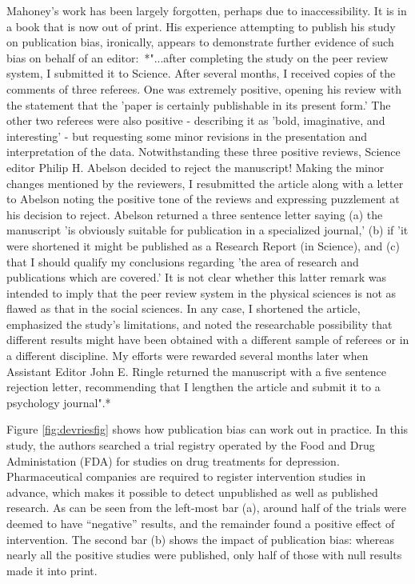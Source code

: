 \documentclass{krantz}
\begin{document}
\begin{tcolorbox}[colback=Black!5!lightgray,colframe=black!75!black,coltitle=white,title=Michael Mahoney: A man ahead of his time]\label{box:Mahoney}
Mahoney's work has been largely forgotten, perhaps due to inaccessibility. It is in a book that is now out of print. His experience attempting to publish his study on publication bias, ironically, appears to demonstrate further evidence of such bias on behalf of an editor:\
*"...after completing the study on the peer review system, I submitted it to Science. After several months, I received copies of the comments of three referees. One was extremely positive, opening his review with the statement that the 'paper is certainly publishable in its present form.' The other two referees were also positive - describing it as 'bold, imaginative, and interesting' - but requesting some minor revisions in the presentation and interpretation of the data. Notwithstanding these three positive reviews, Science editor Philip H. Abelson decided to reject the manuscript! Making the minor changes mentioned by the reviewers, I resubmitted the article along with a letter to Abelson noting the positive tone of the reviews and expressing puzzlement at his decision to reject. Abelson returned a three sentence letter saying (a) the manuscript 'is obviously suitable for publication in a specialized journal,' (b) if 'it were shortened it might be published as a Research Report (in Science), and (c) that I should qualify my conclusions regarding 'the area of research and publications which are covered.' It is not clear whether this latter remark was intended to imply that the peer review system in the physical sciences is not as flawed as that in the social sciences. In any case, I shortened the article, emphasized the study's limitations, and noted the researchable possibility that different results might have been obtained with a different sample of referees or in a different discipline. My efforts were rewarded several months later when Assistant Editor John E. Ringle returned the manuscript with a five sentence rejection letter, recommending that I lengthen the article and submit it to a psychology journal".*

\end{tcolorbox}



Figure \ref{fig:devriesfig} shows how publication bias can work out in practice. In this study, the authors searched a trial registry operated by the Food and Drug Administation (FDA) for studies on drug treatments for depression. Pharmaceutical companies are required to register intervention studies in advance, which makes it possible to detect unpublished as well as published research. As can be seen from the left-most bar (a), around half of the trials were deemed to have ``negative'' results, and the remainder found a positive effect of intervention. The second bar (b) shows the impact of publication bias: whereas nearly all the positive studies were published, only half of those with null results made it into print.
\end{document}

